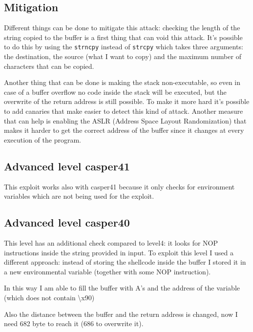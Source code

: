 \documentclass[a4paper,12pt]{article}
\begin{document}

\subsection{Mitigation}

Different things can be done to mitigate this attack: checking the length of the string copied to the buffer is a first thing that can void this attack. It's possible to do this by using the \texttt{strncpy} instead of \texttt{strcpy} which takes three arguments: the destination, the source (what I want to copy) and the maximum number of characters that can be copied.

Another thing that can be done is making the stack non-executable, so even in case of a buffer overflow no code inside the stack will be executed, but the overwrite of the return address is still possible. To make it more hard it's possible to add canaries that make easier to detect this kind of attack. Another measure that can help is enabling the ASLR (Address Space Layout Randomization) that makes it harder to get the correct address of the buffer since it changes at every execution of the program.

\subsection{Advanced level casper41}

This exploit works also with casper41 because it only checks for environment variables which are not being used for the exploit. 

\subsection{Advanced level casper40}

This level has an additional check compared to level4: it looks for NOP instructions inside the string provided in input. To exploit this level I used a different approach: instead of storing the shellcode inside the buffer I stored it in a new environmental variable (together with some NOP instruction).  

In this way I am able to fill the buffer with A's and the address of the variable (which does not contain \textbackslash x90)

Also the distance between the buffer and the return address is changed, now I need 682 byte to reach it (686 to overwrite it).
\end{document}
